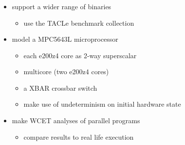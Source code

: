 \documentclass[usenames,dvipsnames]{beamer}
\begin{document}
  \begin{frame}
    \frametitle{\secname}

    \begin{itemize}
      \item support a wider range of binaries
      \begin{itemize}
        \item use the TACLe benchmark collection
      \end{itemize}

      \vspace{1em}
      \item model a MPC5643L microprocessor %
      \begin{itemize}
        \item each e200z4 core as 2-way superscalar
        \item multicore (two e200z4 cores) %
        \item a XBAR crossbar switch
        \item make use of undeterminism on initial hardware state
      \end{itemize}

      \vspace{1em}
      \item make WCET analyses of parallel programs
      \begin{itemize}
        \item compare results to real life execution %
      \end{itemize}
    \end{itemize}
  \end{frame}

\end{document}
